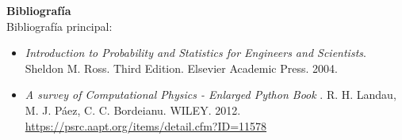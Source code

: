 \documentclass[letterpaper,10pt,onecolumn]{article}
\begin{document}





\vspace*{0.5cm} 

\noindent\textbf{\large {} \quad
  Bibliograf\'ia}\\[-0.2cm] 



\noindent\normalsize Bibliograf\'ia principal:

\begin{itemize}

\item \textit{Introduction to Probability and Statistics for Engineers and
  Scientists}. Sheldon M. Ross. Third Edition. Elsevier Academic
  Press. 2004.

\item
\textit{A survey of Computational Physics - Enlarged Python Book}
. R. H. Landau, M. J. P\'aez, C. C. Bordeianu. WILEY. 2012.
\url{https://psrc.aapt.org/items/detail.cfm?ID=11578}




\end{itemize}
\end{document}
